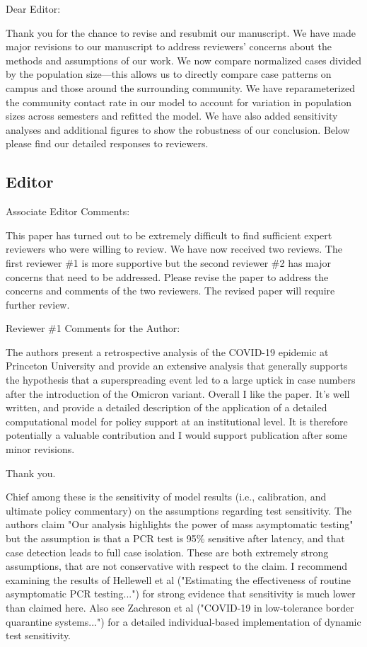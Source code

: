 \documentclass[12pt]{article}
\newcommand{\rev}{\subsection*}
\newcommand{\revtext}{\textsf}
\begin{document}
\noindent Dear Editor:

Thank you for the chance to revise and resubmit our manuscript.
We have made major revisions to our manuscript to address reviewers' concerns about the methods and assumptions of our work.
We now compare normalized cases divided by the population size---this allows us to directly compare case patterns on campus and those around the surrounding community.
We have reparameterized the community contact rate in our model to account for variation in population sizes across semesters and refitted the model.
We have also added sensitivity analyses and additional figures to show the robustness of our conclusion.
Below please find our detailed responses to reviewers.

\rev{Editor}

\revtext{Associate Editor Comments: }

\revtext{This paper has turned out to be extremely difficult to find sufficient expert reviewers who were willing to review. We have now received two reviews. The first reviewer \#1 is more supportive but the second reviewer \#2 has major concerns that need to be addressed. Please revise the paper to address the concerns and comments of the two reviewers. The revised paper will require further review.}

\revtext{Reviewer \#1 Comments for the Author:}

\revtext{The authors present a retrospective analysis of the COVID-19 epidemic at Princeton University and provide an extensive analysis that generally supports the hypothesis that a superspreading event led to a large uptick in case numbers after the introduction of the Omicron variant. Overall I like the paper. It's well written, and provide a detailed description of the application of a detailed computational model for policy support at an institutional level. It is therefore potentially a valuable contribution and I would support publication after some minor revisions.}

Thank you.

\revtext{Chief among these is the sensitivity of model results (i.e., calibration, and ultimate policy commentary) on the assumptions regarding test sensitivity. The authors claim "Our analysis highlights the power of mass asymptomatic testing" but the assumption is that a PCR test is 95\% sensitive after latency, and that case detection leads to full case isolation. These are both extremely strong assumptions, that are not conservative with respect to the claim. I recommend examining the results of Hellewell et al ("Estimating the effectiveness of routine asymptomatic PCR testing...") for strong evidence that sensitivity is much lower than claimed here. Also see Zachreson et al ("COVID-19 in low-tolerance border quarantine systems...") for a detailed individual-based implementation of dynamic test sensitivity.}
\end{document}
